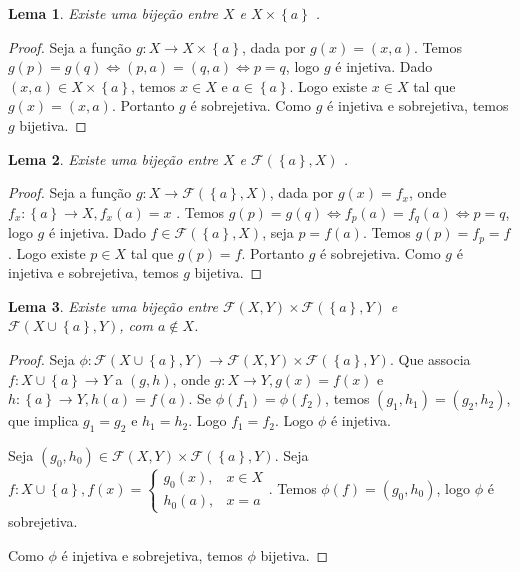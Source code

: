 \documentclass{article}
\theoremstyle{theorem}
\theoremstyle{lemma}
\newtheorem{lema}{Lema}
\theoremstyle{definition}
\theoremstyle{remark}
\begin{document}
\begin{lema}
	Existe uma bijeção entre $X$ e  $X \times \left\{ a\right\}$ .
\end{lema}
\begin{proof}
	Seja a função $g: X  \to  X \times \left\{a\right\}$, dada por $g(x) = (x,a)$. Temos $g(p) = g(q) \iff (p,a) = (q,a) \iff p = q $, logo $g$ é injetiva. Dado $(x,a) \in X \times \left\{ a\right\}$, temos $x\in X$ e $a\in \left\{a\right\}$. Logo existe $x\in X$ tal que $g(x) = (x,a) $. Portanto $g$ é sobrejetiva. Como $g$ é injetiva e sobrejetiva, temos  $g$  bijetiva.
\end{proof}
\begin{lema}
	Existe uma bijeção entre $X$ e  $\mathcal{F}(\left\{a\right\}, X )$ .
\end{lema}
\begin{proof}
	Seja a função $g: X  \to  \mathcal{F}( \left\{a\right\}, X )$, dada por $g(x) = f_x$, onde $f_x: \left\{ a\right\} \to X, f_x(a) = x$ . Temos $g(p) = g(q) \iff f_p(a) = f_q(a) \iff p = q $, logo $g$ é injetiva. Dado $f \in \mathcal{F}( \left\{ a\right\}, X)$, seja $p = f(a)$. Temos $g(p) = f_p = f$. Logo existe $p\in X$ tal que $g(p) = f $. Portanto $g$ é sobrejetiva. Como $g$ é injetiva e sobrejetiva, temos  $g$  bijetiva.
\end{proof}
\begin{lema}
	Existe uma bijeção entre $\mathcal{F}(X  , Y )\times \mathcal{F}( \left\{ a \right\} , Y ) $ e  $\mathcal{F}(X \cup \left\{ a \right\} , Y )$, com $a\not \in X$.
\end{lema}
\begin{proof}
	Seja $\phi: \mathcal{F}(X \cup \left\{ a \right\} , Y ) \to \mathcal{F}(X  , Y )\times \mathcal{F}( \left\{ a \right\} , Y ) $. Que associa $f: X\cup \left\{a\right\} \to Y$ a $(g,h)$, onde $g: X\to Y, g(x) = f(x)$ e $h: \left\{a\right\} \to Y, h(a) = f(a)$. Se $\phi(f_1) = \phi(f_2)$, temos $(g_1, h_1) = (g_2, h_2)$, que implica $g_1 = g_2$ e $h_1 = h_2$. Logo $f_1 = f_2$. Logo $\phi$ é injetiva. 

	Seja $(g_0,h_0) \in \mathcal{F}(X  , Y )\times \mathcal{F}( \left\{ a \right\} , Y ) $. Seja $f: X\cup \left\{a\right\}, f(x) = \begin{cases} g_0(x), & x\in X \\ h_0(a), &x= a \end{cases}$. Temos $\phi(f)  = (g_0,h_0)$, logo $\phi$ é sobrejetiva.

		Como $\phi$ é injetiva e sobrejetiva, temos $\phi$ bijetiva.
\end{proof}
\end{document}
